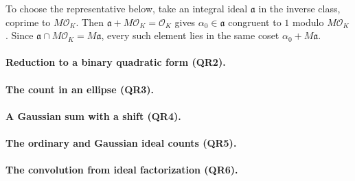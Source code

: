 To choose the representative below, take an integral ideal $\mathfrak a$ in the inverse class, coprime to $M\mathcal O_K$. Then $\mathfrak a+M\mathcal O_K=\mathcal O_K$ gives $\alpha_0\in\mathfrak a$ congruent to $1$ modulo $M\mathcal O_K$. Since $\mathfrak a\cap M\mathcal O_K=M\mathfrak a$, every such element lies in the same coset $\alpha_0+M\mathfrak a$.



\paragraph{Reduction to a binary quadratic form (QR2).}



\paragraph{The count in an ellipse (QR3).}



\paragraph{A Gaussian sum with a shift (QR4).}



\paragraph{The ordinary and Gaussian ideal counts (QR5).}



\paragraph{The convolution from ideal factorization (QR6).}



